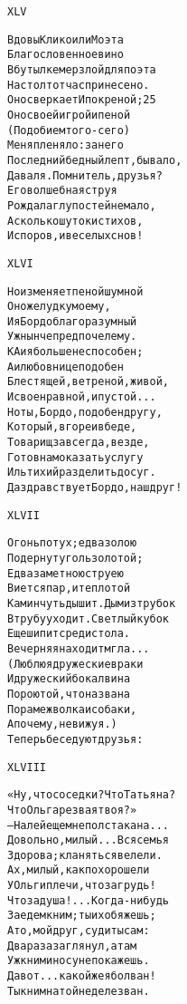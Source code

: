 \begin{minipage}[t]{\dimexpr 0.5\textwidth -\tabcolsep-.5pt}
\begin{alltt}\normalfont\centering
XLV

Вдовы Клико или Моэта
Благословенное вино
В бутылке мерзлой для поэта
На стол тотчас принесено.
Оно сверкает Ипокреной; 25
Оно своей игрой и пеной
(Подобием того-сего)
Меня пленяло: за него
Последний бедный лепт, бывало,
Давал я. Помните ль, друзья?
Его волшебная струя
Рождала глупостей не мало,
А сколько шуток и стихов,
И споров, и веселых снов!
\end{alltt}
\end{minipage}

\begin{minipage}[t]{\dimexpr 0.5\textwidth -\tabcolsep-.5pt}
\begin{alltt}\normalfont\centering
XLVI

Но изменяет пеной шумной
Оно желудку моему,
И я Бордо благоразумный
Уж нынче предпочел ему.
К Аи я больше не способен;
Аи любовнице подобен
Блестящей, ветреной, живой,
И своенравной, и пустой...
Но ты, Бордо, подобен другу,
Который, в горе и в беде,
Товарищ завсегда, везде,
Готов нам оказать услугу
Иль тихий разделить досуг.
Да здравствует Бордо, наш друг!
\end{alltt}
\end{minipage}
\clearpage

\begin{minipage}[t]{\dimexpr 0.5\textwidth -\tabcolsep-.5pt}
\begin{alltt}\normalfont\centering
XLVII

Огонь потух; едва золою
Подернут уголь золотой;
Едва заметною струею
Виется пар, и теплотой
Камин чуть дышит. Дым из трубок
В трубу уходит. Светлый кубок
Еще шипит среди стола.
Вечерняя находит мгла...
(Люблю я дружеские враки
И дружеский бокал вина
Порою той, что названа
Пора меж волка и собаки,
А почему, не вижу я.)
Теперь беседуют друзья:
\end{alltt}
\end{minipage}

\begin{minipage}[t]{\dimexpr 0.5\textwidth -\tabcolsep-.5pt}
\begin{alltt}\normalfont\centering
XLVIII

«Ну, что соседки? Что Татьяна?
Что Ольга резвая твоя?»
— Налей еще мне полстакана...
Довольно, милый... Вся семья
Здорова; кланяться велели.
Ах, милый, как похорошели
У Ольги плечи, что за грудь!
Что за душа!... Когда-нибудь
Заедем к ним; ты их обяжешь;
А то, мой друг, суди ты сам:
Два раза заглянул, а там
Уж к ним и носу не покажешь.
Да вот... какой же я болван!
Ты к ним на той неделе зван.
\end{alltt}
\end{minipage}
\clearpage

